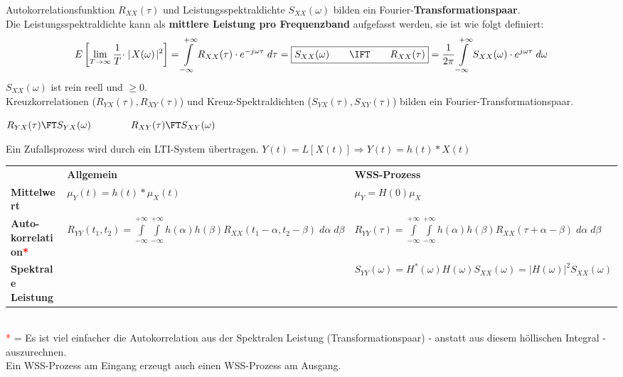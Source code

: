 Autokorrelationsfunktion $R_{XX}(\tau)$ und Leistungsspektraldichte $S_{XX}(\omega)$ bilden ein
Fourier-\textbf{Transformationspaar}. \\ Die Leistungsspektraldichte kann als \textbf{mittlere Leistung pro Frequenzband }aufgefasst werden, sie ist
wie folgt definiert:                             
        $$ E\left[ \lim\limits_{T \rightarrow \infty} \frac{1}{T} \cdot \mid\!
        X(\omega) \!\mid^{2}\right] = \int\limits_{-\infty}^{+\infty}
        R_{XX}(\tau) \cdot e^{-j\omega\tau} \; d\tau = \boxed{S_{XX}(\omega)
        \qquad \IFT \qquad R_{XX}(\tau)} = \frac{1}{2\pi}
        \int\limits_{-\infty}^{+\infty}S_{XX}(\omega) \cdot e^{j\omega\tau} \;
        d\omega$$ $S_{XX}(\omega)$ ist rein reell und $\geq 0$. \\
Kreuzkorrelationen ($R_{YX}(\tau), R_{XY}(\tau)$) und Kreuz-Spektraldichten ($S_{YX}(\tau),
S_{XY}(\tau)$) bilden ein Fourier-Transformationspaar.
\begin{center}
	$R_{YX}(\tau) \FT S_{YX}(\omega) \qquad \qquad R_{XY}(\tau) \FT S_{XY}(\omega)$
\end{center}



Ein Zufallsprozess wird durch ein LTI-System übertragen. \hspace{2cm} $Y(t) = L[X(t)] \Rightarrow
Y(t) = h(t) \ast X(t)$ \vspace{0.3cm}\\
\renewcommand{\arraystretch}{1.4}
 \begin{tabular}[c]{ p{2cm}  p{8.5cm} p{8cm} }
	& \textbf{Allgemein} & \textbf{WSS-Prozess} \\
	\textbf{Mittelwert}
		& $\mu_{Y}(t) = h(t) \ast \mu_{X}(t)$
		& $\mu_{Y} = H(0) \mu_{X}$ \\
	\textbf{Auto-korrelation\textcolor{red}{*}}
		& {$R_{YY}(t_{1},t_{2}) = \int\limits_{-\infty}^{+\infty}
		\int\limits_{-\infty}^{+\infty} h(\alpha) h(\beta)
                      R_{XX}(t_{1}-\alpha, t_{2}-\beta) \; d\alpha \; d\beta$}
		& {$R_{YY}(\tau) = \int\limits_{-\infty}^{+\infty}
		\int\limits_{-\infty}^{+\infty} h(\alpha) h(\beta)
                      R_{XX}(\tau+\alpha-\beta) \; d\alpha \; d\beta$} \\
	\textbf{Spektrale Leistung}
		&
		& $\boxed{S_{YY}(\omega)= H^{\ast}(\omega) H(\omega) S_{XX}(\omega)
			= |H(\omega)|^{2} S_{XX}(\omega)}$  \\
\end{tabular}
\renewcommand{\arraystretch}{1} \\
\textcolor{red}{*} = Es ist viel einfacher die Autokorrelation aus der Spektralen Leistung
(Transformationspaar) - anstatt aus diesem höllischen Integral - auszurechnen. \\
Ein WSS-Prozess am Eingang erzeugt auch einen WSS-Prozess am Ausgang.

